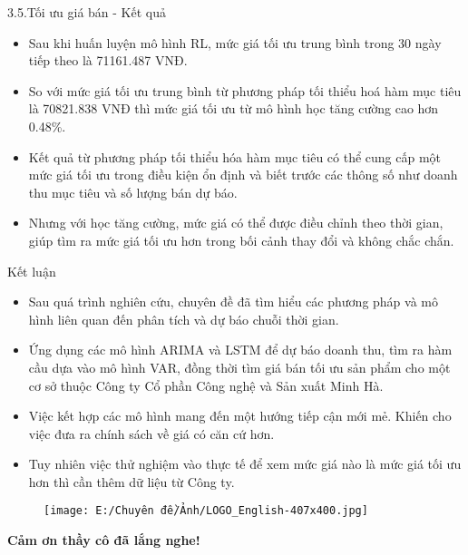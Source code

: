 \documentclass{beamer}
\begin{document}
	\begin{frame}{3.5.Tối ưu giá bán - Kết quả}
		\begin{itemize}
			\item Sau khi huấn luyện mô hình RL, mức giá tối ưu trung bình trong 30 ngày tiếp theo là 71161.487 VNĐ. 
			\item So với mức giá tối ưu trung bình từ phương pháp tối thiểu hoá hàm mục tiêu là 70821.838 VNĐ thì mức giá tối ưu từ mô hình học tăng cường cao hơn 0.48\%.
			\item Kết quả từ phương pháp tối thiểu hóa hàm mục tiêu có thể cung cấp một mức giá tối ưu trong điều kiện ổn định và biết trước các thông số như doanh thu mục tiêu và số lượng bán dự báo. 
			\item Nhưng với học tăng cường, mức giá có thể được điều chỉnh theo thời gian, giúp tìm ra mức giá tối ưu hơn trong bối cảnh thay đổi và không chắc chắn.
		\end{itemize}
	\end{frame}
	
	\begin{frame}{Kết luận}
		\begin{itemize}
			\item Sau quá trình nghiên cứu, chuyên đề đã tìm hiểu các phương pháp và mô hình liên quan đến phân tích và dự báo chuỗi thời gian. 
			\item Ứng dụng các mô hình ARIMA và LSTM để dự báo doanh thu, tìm ra hàm cầu dựa vào mô hình VAR, đồng thời tìm giá bán tối ưu sản phẩm cho một cơ sở thuộc Công ty Cổ phần Công nghệ và Sản xuất Minh Hà.
			\item Việc kết hợp các mô hình mang đến một hướng tiếp cận mới mẻ. Khiến cho việc đưa ra chính sách về giá có căn cứ hơn.
			\item Tuy nhiên việc thử nghiệm vào thực tế để xem mức giá nào là mức giá tối ưu hơn thì cần thêm dữ liệu từ Công ty.
		\end{itemize}
	\end{frame}
	
	\begin{frame}
		\begin{figure}
			\centering
			\texttt{[image: E:/Chuyên đề/Ảnh/LOGO\_English-407x400.jpg]}
			\hfill
		\end{figure}
		\centering
		\textcolor{blue}{\Huge}
		\textbf{\huge Cảm ơn thầy cô đã lắng nghe!} \\[12pt]
		
	\end{frame}
\end{document}
